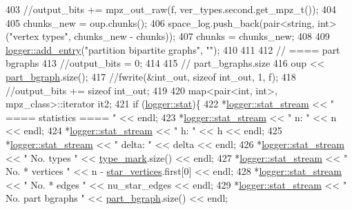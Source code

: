 \begin{DoxyCode}
403   \textcolor{comment}{//output\_bits += mpz\_out\_raw(f, ver\_types.second.get\_mpz\_t());}
404 
405   chunks\_new = oup.chunks();
406   space\_log.push\_back(pair<string, int> (\textcolor{stringliteral}{"vertex types"}, chunks\_new - chunks));
407   chunks = chunks\_new;
408 
409   \hyperlink{classlogger_a710163deb17bc81f70d53d285b8ac9ac}{logger::add\_entry}(\textcolor{stringliteral}{"partition bipartite graphs"}, \textcolor{stringliteral}{""});
410   
411 
412   \textcolor{comment}{// ==== part bgraphs}
413   \textcolor{comment}{//output\_bits = 0;}
414 
415   \textcolor{comment}{// part\_bgraphs.size}
416   oup << \hyperlink{classmarked__graph__compressed_a7b3267063fba30b45eb21b3ba4e07536}{part\_bgraph}.size();
417   \textcolor{comment}{//fwrite(&int\_out, sizeof int\_out, 1, f);}
418   \textcolor{comment}{//output\_bits += sizeof int\_out;}
419 
420   map<pair<int, int>, mpz\_class>::iterator it2;
421   \textcolor{keywordflow}{if} (\hyperlink{classlogger_a26812b5ba03f130e8dae3446d5fc032f}{logger::stat})\{
422     *\hyperlink{classlogger_a7db37821f875f2ba3540980b355779f5}{logger::stat\_stream} << \textcolor{stringliteral}{" ==== statistics ==== "} << endl;
423     *\hyperlink{classlogger_a7db37821f875f2ba3540980b355779f5}{logger::stat\_stream} << \textcolor{stringliteral}{" n:                "} << n << endl;
424     *\hyperlink{classlogger_a7db37821f875f2ba3540980b355779f5}{logger::stat\_stream} << \textcolor{stringliteral}{" h:                "} << h << endl;
425     *\hyperlink{classlogger_a7db37821f875f2ba3540980b355779f5}{logger::stat\_stream} << \textcolor{stringliteral}{" delta:            "} << delta << endl;
426     *\hyperlink{classlogger_a7db37821f875f2ba3540980b355779f5}{logger::stat\_stream} << \textcolor{stringliteral}{" No. types         "} << 
      \hyperlink{classmarked__graph__compressed_a86b00223525703e973415cbc9c94da68}{type\_mark}.size() << endl;
427     *\hyperlink{classlogger_a7db37821f875f2ba3540980b355779f5}{logger::stat\_stream} << \textcolor{stringliteral}{" No. * vertices    "} << n - 
      \hyperlink{classmarked__graph__compressed_a7a4ced4586e2e353f9076bd447df5208}{star\_vertices}.first[0] << endl;
428     *\hyperlink{classlogger_a7db37821f875f2ba3540980b355779f5}{logger::stat\_stream} << \textcolor{stringliteral}{" No. * edges       "} << nu\_star\_edges << endl;
429     *\hyperlink{classlogger_a7db37821f875f2ba3540980b355779f5}{logger::stat\_stream} << \textcolor{stringliteral}{" No. part bgraphs  "} << 
      \hyperlink{classmarked__graph__compressed_a7b3267063fba30b45eb21b3ba4e07536}{part\_bgraph}.size() << endl;

\end{DoxyCode}
